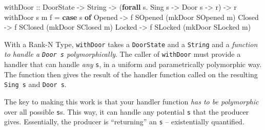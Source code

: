 \documentclass[]{article}
\newenvironment{Shaded}{}{}
\newcommand{\DataTypeTok}[1]{\textcolor[rgb]{0.56,0.13,0.00}{#1}}
\newcommand{\KeywordTok}[1]{\textcolor[rgb]{0.00,0.44,0.13}{\textbf{#1}}}
\newcommand{\NormalTok}[1]{#1}
\newcommand{\OperatorTok}[1]{\textcolor[rgb]{0.40,0.40,0.40}{#1}}
\newcommand{\OtherTok}[1]{\textcolor[rgb]{0.00,0.44,0.13}{#1}}
\newcommand{\StringTok}[1]{\textcolor[rgb]{0.25,0.44,0.63}{#1}}
\begin{document}
\begin{Shaded}
\begin{Highlighting}[]
\NormalTok{withDoor}
\OtherTok{    ::} \DataTypeTok{DoorState}
    \OtherTok{{-}>} \DataTypeTok{String}
    \OtherTok{{-}>}\NormalTok{ (}\KeywordTok{forall}\NormalTok{ s}\OperatorTok{.} \DataTypeTok{Sing}\NormalTok{ s }\OtherTok{{-}>} \DataTypeTok{Door}\NormalTok{ s }\OtherTok{{-}>}\NormalTok{ r)}
    \OtherTok{{-}>}\NormalTok{ r}
\NormalTok{withDoor s m f }\OtherTok{=} \KeywordTok{case}\NormalTok{ s }\KeywordTok{of}
    \DataTypeTok{Opened} \OtherTok{{-}>}\NormalTok{ f }\DataTypeTok{SOpened}\NormalTok{ (mkDoor }\DataTypeTok{SOpened}\NormalTok{ m)}
    \DataTypeTok{Closed} \OtherTok{{-}>}\NormalTok{ f }\DataTypeTok{SClosed}\NormalTok{ (mkDoor }\DataTypeTok{SClosed}\NormalTok{ m)}
    \DataTypeTok{Locked} \OtherTok{{-}>}\NormalTok{ f }\DataTypeTok{SLocked}\NormalTok{ (mkDoor }\DataTypeTok{SLocked}\NormalTok{ m)}
\end{Highlighting}
\end{Shaded}

With a Rank-N Type, \texttt{withDoor} takes a \texttt{DoorState} and a
\texttt{String} and a \emph{function to handle a \texttt{Door\ s}
polymorphically}. The caller of \texttt{withDoor} must provide a handler that
can handle \emph{any} \texttt{s}, in a uniform and parametrically polymorphic
way. The function then gives the result of the handler function called on the
resulting \texttt{Sing\ s} and \texttt{Door\ s}.

\begin{Shaded}
\end{Shaded}

The key to making this work is that your handler function \emph{has to be
polymorphic} over all possible \texttt{s}s. This way, it can handle any
potential \texttt{s} that the producer gives. Essentially, the producer is
``returning'' an \texttt{s} -- existentially quantified.
\end{document}
